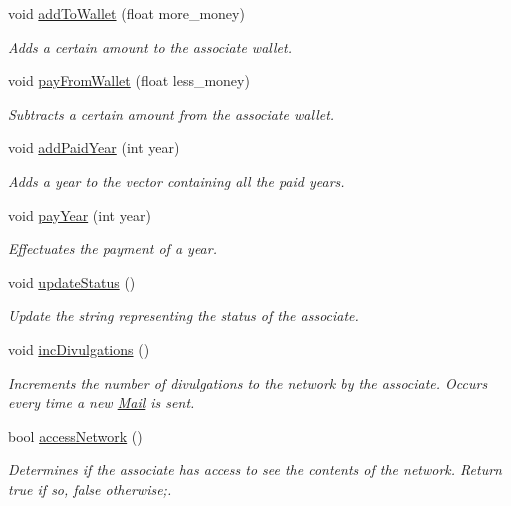 \begin{DoxyCompactItemize}
void \hyperlink{classAssociate_a3fcb7919843353de4d4591b2bd627189}{add\+To\+Wallet} (float more\+\_\+money)
\begin{DoxyCompactList}\small\item\em Adds a certain amount to the associate wallet. \end{DoxyCompactList}\item 
void \hyperlink{classAssociate_a81f6e7e09ce00a9bf2a805d47d542b90}{pay\+From\+Wallet} (float less\+\_\+money)
\begin{DoxyCompactList}\small\item\em Subtracts a certain amount from the associate wallet. \end{DoxyCompactList}\item 
void \hyperlink{classAssociate_a12bec7095075fd58fafb5ebf2a24e924}{add\+Paid\+Year} (int year)
\begin{DoxyCompactList}\small\item\em Adds a year to the vector containing all the paid years. \end{DoxyCompactList}\item 
void \hyperlink{classAssociate_ac5d76c7a552e5ad9149fc968511532bf}{pay\+Year} (int year)
\begin{DoxyCompactList}\small\item\em Effectuates the payment of a year. \end{DoxyCompactList}\item 
void \hyperlink{classAssociate_aec791e8d29c2c8ccf9769a6ac49a3af5}{update\+Status} ()
\begin{DoxyCompactList}\small\item\em Update the string representing the status of the associate. \end{DoxyCompactList}\item 
void \hyperlink{classAssociate_a5d298ea460b494edc46c015af7e1a932}{inc\+Divulgations} ()
\begin{DoxyCompactList}\small\item\em Increments the number of divulgations to the network by the associate. Occurs every time a new \hyperlink{classMail}{Mail} is sent. \end{DoxyCompactList}\item 
bool \hyperlink{classAssociate_a147bd9c2b6148974d8c36f7a8f5b632a}{access\+Network} ()
\begin{DoxyCompactList}\small\item\em Determines if the associate has access to see the contents of the network. Return true if so, false otherwise;. \end{DoxyCompactList}\item 

\end{DoxyCompactItemize}
